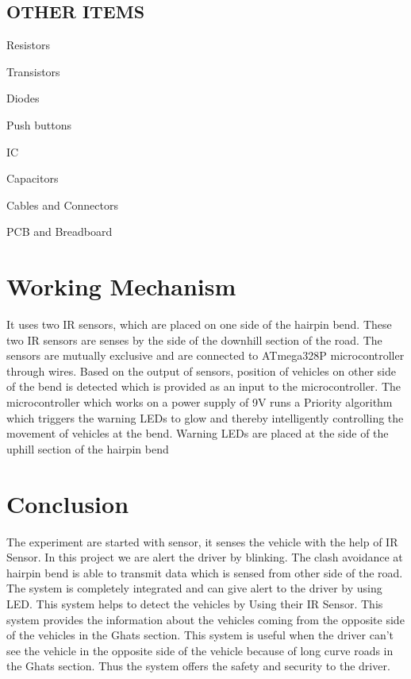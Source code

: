\documentclass[conference]{IEEEtran}
\begin{document}
    \subsection{OTHER ITEMS}
    \itemize
    \item Resistors
    \item Transistors
    \item Diodes
    \item Push buttons
    \item IC
    \item Capacitors
    \item Cables and Connectors
    \item PCB and Breadboard
    \enditemize


    \section{Working Mechanism}
    It uses two IR sensors, which are
    placed on one side of the hairpin bend. These two IR sensors
    are senses by the side of the downhill section of the road.
    The sensors are mutually exclusive and are connected to
    ATmega328P microcontroller through wires. Based on the
    output of sensors, position of vehicles on other side of the
    bend is detected which is provided as an input to the
    microcontroller. The microcontroller which works on a
    power supply of 9V runs a Priority algorithm which triggers
    the warning LEDs to glow and thereby intelligently
    controlling the movement of vehicles at the bend. Warning
    LEDs are placed at the side of the uphill section of the
    hairpin bend

    \section{Conclusion}
    The experiment are started with sensor, it senses the vehicle
    with the help of IR Sensor. In this project we are alert the
    driver by blinking. The clash avoidance at hairpin bend is
    able to transmit data which is sensed from other side of the
    road. The system is completely integrated and can give alert
    to the driver by using LED. This system helps to detect the
    vehicles by Using their IR Sensor. This system provides the
    information about the vehicles coming from the opposite side of the vehicles in the Ghats section. This system is useful
    when the driver can't see the vehicle in the opposite side of
    the vehicle because of long curve roads in the Ghats section.
    Thus the system offers the safety and security to the driver.
\end{document}
